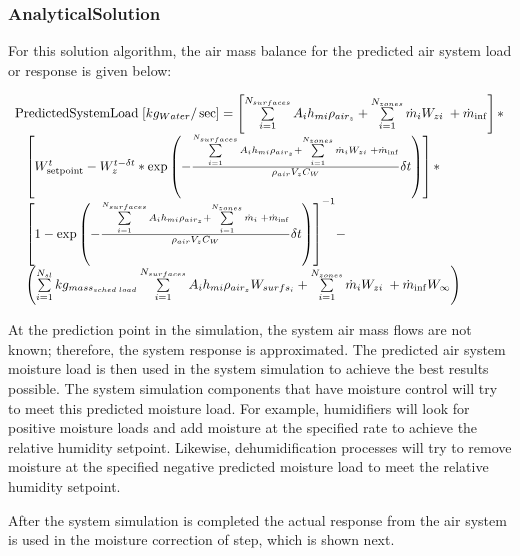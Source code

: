 \subsubsection{AnalyticalSolution}\label{analyticalsolution-001}

For this solution algorithm, the air mass balance for the predicted air system load or response is given below:

\begin{equation}
\begin{array}{l}{\rm{PredictedSystemLoad}}\;[k{g_{Water}}/\sec ] = \left[ {\sum\limits_{i = 1}^{{N_{surfaces}}} {{A_i}{h_{mi}}} {\rho_{ai{r_z}}} + \sum\limits_{i = 1}^{{N_{zones}}} {{{\dot m}_i}} {W_{zi}}\; + {{\dot m}_{\inf }}} \right]*\\\;\;\;\left[ {W_{{\rm{setpoint}}}^t - W_z^{t - \delta t}*\exp \left( { - \frac{{\sum\limits_{i = 1}^{{N_{surfaces}}} {{A_i}{h_{mi}}} {\rho_{ai{r_z}}} + \sum\limits_{i = 1}^{{N_{zones}}} {{{\dot m}_i}} {W_{zi}}\; + {{\dot m}_{\inf }}}}{{{\rho_{air}}{V_z}{C_W}}}\delta t} \right)} \right]*\\\;\;\;{\left[ {1 - \exp \left( { - \frac{{\sum\limits_{i = 1}^{{N_{surfaces}}} {{A_i}{h_{mi}}} {\rho_{ai{r_z}}} + \sum\limits_{i = 1}^{{N_{zones}}} {{{\dot m}_i}} \; + {{\dot m}_{\inf }}}}{{{\rho_{air}}{V_z}{C_W}}}\delta t} \right)} \right]^{ - 1}} - \\\;\;\;\left( {\sum\limits_{i = 1}^{{N_{sl}}} {k{g_{mas{s_{sched\;load}}}}} \sum\limits_{i = 1}^{{N_{surfaces}}} {{A_i}{h_{mi}}} {\rho_{ai{r_z}}}{W_{surf{s_i}}} + \sum\limits_{i = 1}^{{N_{zones}}} {{{\dot m}_i}} {W_{zi}}\; + {{\dot m}_{\inf }}{W_\infty }} \right)\end{array}
\end{equation}

At the prediction point in the simulation, the system air mass flows are not known; therefore, the system response is approximated. The predicted air system moisture load is then used in the system simulation to achieve the best results possible. The system simulation components that have moisture control will try to meet this predicted moisture load. For example, humidifiers will look for positive moisture loads and add moisture at the specified rate to achieve the relative humidity setpoint. Likewise, dehumidification processes will try to remove moisture at the specified negative predicted moisture load to meet the relative humidity setpoint.

After the system simulation is completed the actual response from the air system is used in the moisture correction of step, which is shown next.

